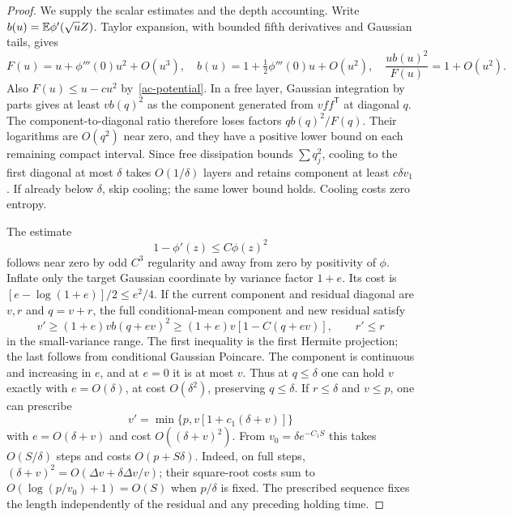 \begin{proof}
We supply the scalar estimates and the depth accounting. Write
$b(u)=\mathbb E\phi'(\sqrt uZ)$. Taylor expansion, with bounded fifth
derivatives and Gaussian tails, gives
\begin{equation}\label{ac-cooling-expansions}
 F(u)=u+\phi'''(0)u^2+O(u^3),\quad
 b(u)=1+\tfrac12\phi'''(0)u+O(u^2),\quad
 \frac{u b(u)^2}{F(u)}=1+O(u^2).
\end{equation}
Also $F(u)\le u-cu^2$ by~\eqref{ac-potential}. In a free layer,
Gaussian integration by parts gives at least $v b(q)^2$ as the
component generated from $vff^{\mathsf T}$ at diagonal $q$.
The component-to-diagonal ratio therefore loses factors
$q b(q)^2/F(q)$. Their logarithms are $O(q^2)$ near zero, and
they have a positive lower bound on each remaining compact interval.
Since free dissipation bounds $\sum q_j^2$, cooling to the first
diagonal at most $\delta$ takes $O(1/\delta)$ layers and retains
component at least $c\delta v_1$. If already below $\delta$, skip
cooling; the same lower bound holds. Cooling costs zero entropy.

The estimate
\begin{equation}\label{ac-derivative-comparison}
 1-\phi'(z)\le C\phi(z)^2
\end{equation}
follows near zero by odd $C^3$ regularity and away from zero by
positivity of $\phi$. Inflate only the target Gaussian coordinate
by variance factor $1+e$. Its cost is
$[e-\log(1+e)]/2\le e^2/4$. If the current component and residual
diagonal are $v,r$ and $q=v+r$, the full conditional-mean component
and new residual satisfy
\begin{equation}\label{ac-growth}
 v'\ge(1+e)v b(q+ev)^2
       \ge(1+e)v[1-C(q+ev)],\qquad r'\le r
\end{equation}
in the small-variance range. The first inequality is the first Hermite
projection; the last follows from conditional Gaussian Poincare.
The component is continuous and increasing in $e$, and at $e=0$
it is at most $v$. Thus at $q\le\delta$ one can hold $v$ exactly
with $e=O(\delta)$, at cost $O(\delta^2)$, preserving $q\le\delta$.
If $r\le\delta$ and $v\le p$, one can prescribe
\[
 v' =\min\{p,v[1+c_1(\delta+v)]\}
\]
with $e=O(\delta+v)$ and cost $O((\delta+v)^2)$. From
$v_0=\delta e^{-C_1S}$ this takes $O(S/\delta)$ steps and costs
$O(p+S\delta)$. Indeed, on full steps,
$(\delta+v)^2=O(\Delta v+\delta\Delta v/v)$;
their square-root costs sum to $O(\log(p/v_0)+1)=O(S)$ when
$p/\delta$ is fixed. The prescribed sequence fixes the length
independently of the residual and any preceding holding time.


\end{proof}

